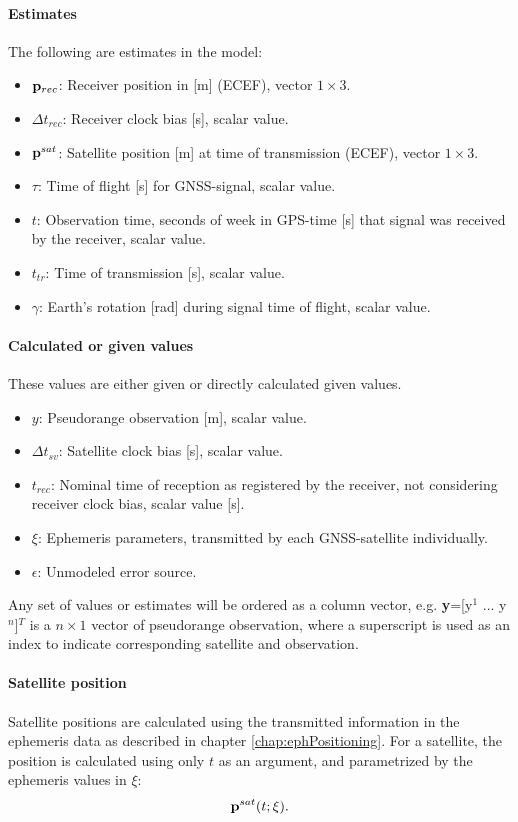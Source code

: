\paragraph{Estimates} The following are estimates in the model:
\begin{itemize}
\item ${\bf p}_{rec}$: Receiver position in [m] (ECEF), vector $1\times 3$.
\item $\Delta t_{rec}$: Receiver clock bias [s], scalar value.
\item ${\bf p}^{sat}$: Satellite position [m] at time of transmission (ECEF), vector $1\times 3$.
\item $\tau$: Time of flight [s] for GNSS-signal, scalar value.
\item $t$: Observation time, seconds of week in GPS-time [s] that signal was received by the receiver, scalar value.
\item $t_{tr}$: Time of transmission [s], scalar value.
\item $\gamma$: Earth's rotation [rad] during signal time of flight, scalar value.
\end{itemize}
\paragraph{Calculated or given values}
These values are either given or directly calculated given values.
\begin{itemize}
\item $y$: Pseudorange observation [m], scalar value.
\item $\Delta t_{sv}$: Satellite clock bias [s], scalar value.
\item $t_{rec}$: Nominal time of reception as registered by the receiver, not considering receiver clock bias, scalar value [s].
\item $\xi$: Ephemeris parameters, transmitted by each GNSS-satellite individually.
\item $\epsilon$: Unmodeled error source.
\end{itemize}
Any set of values or estimates will be ordered as a column vector, e.g. \textbf{y}=[y$^1$ ... y$^n$]$^T$ is a $n\times1$ vector of pseudorange observation, where a superscript is used as an index to indicate corresponding satellite and observation. 

\paragraph{Satellite position}
Satellite positions are calculated using the transmitted information in the ephemeris data as described in chapter \ref{chap:ephPositioning}. For a satellite, the position is calculated using only $t$ as an argument, and parametrized by the ephemeris values in $\xi$:
\begin{equation}\label{eq:p_sat}
{\bf p}^{sat}(t; \xi).
\end{equation}
